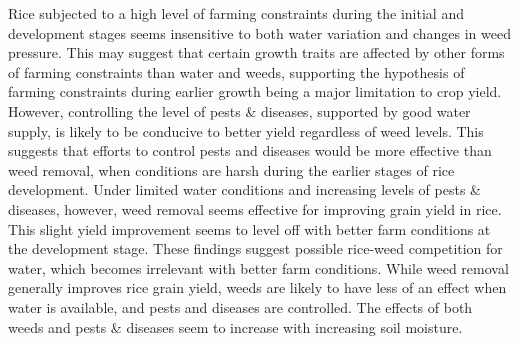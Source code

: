 \documentclass[]{elsarticle} %
\begin{document}
Rice subjected to a high level of farming constraints during the initial and development stages seems insensitive to both water variation and changes in weed pressure. This may suggest that certain growth traits are affected by other forms of farming constraints than water and weeds, supporting the hypothesis of farming constraints during earlier growth being a major limitation to crop yield. However, controlling the level of pests \& diseases, supported by good water supply, is likely to be conducive to better yield regardless of weed levels. This suggests that efforts to control pests and diseases would be more effective than weed removal, when conditions are harsh during the earlier stages of rice development. Under limited water conditions and increasing levels of pests \& diseases, however, weed removal seems effective for improving grain yield in rice. This slight yield improvement seems to level off with better farm conditions at the development stage. These findings suggest possible rice-weed competition for water, which becomes irrelevant with better farm conditions. While weed removal generally improves rice grain yield, weeds are likely to have less of an effect when water is available, and pests and diseases are controlled. The effects of both weeds and pests \& diseases seem to increase with increasing soil moisture.
\end{document}
